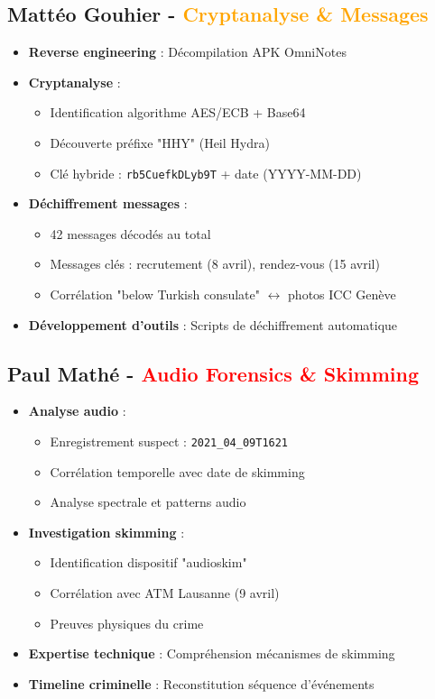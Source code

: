 \documentclass[11pt,a4paper]{article}
\begin{document}
\subsection{Mattéo Gouhier - \textcolor{orange}{Cryptanalyse \& Messages}}
\begin{itemize}[leftmargin=*]
    \item \textbf{Reverse engineering} : Décompilation APK OmniNotes
    \item \textbf{Cryptanalyse} :
    \begin{itemize}
        \item Identification algorithme AES/ECB + Base64
        \item Découverte préfixe "HHY" (Heil Hydra)
        \item Clé hybride : \texttt{rb5CuefkDLyb9T} + date (YYYY-MM-DD)
    \end{itemize}
    \item \textbf{Déchiffrement messages} :
    \begin{itemize}
        \item 42 messages décodés au total
        \item Messages clés : recrutement (8 avril), rendez-vous (15 avril)
        \item Corrélation "below Turkish consulate" $\leftrightarrow$ photos ICC Genève
    \end{itemize}
    \item \textbf{Développement d'outils} : Scripts de déchiffrement automatique
\end{itemize}

\subsection{Paul Mathé - \textcolor{red}{Audio Forensics \& Skimming}}
\begin{itemize}[leftmargin=*]
    \item \textbf{Analyse audio} :
    \begin{itemize}
        \item Enregistrement suspect : \texttt{2021\_04\_09T1621}
        \item Corrélation temporelle avec date de skimming
        \item Analyse spectrale et patterns audio
    \end{itemize}
    \item \textbf{Investigation skimming} :
    \begin{itemize}
        \item Identification dispositif "audioskim"
        \item Corrélation avec ATM Lausanne (9 avril)
        \item Preuves physiques du crime
    \end{itemize}
    \item \textbf{Expertise technique} : Compréhension mécanismes de skimming
    \item \textbf{Timeline criminelle} : Reconstitution séquence d'événements
\end{itemize}
\end{document}
